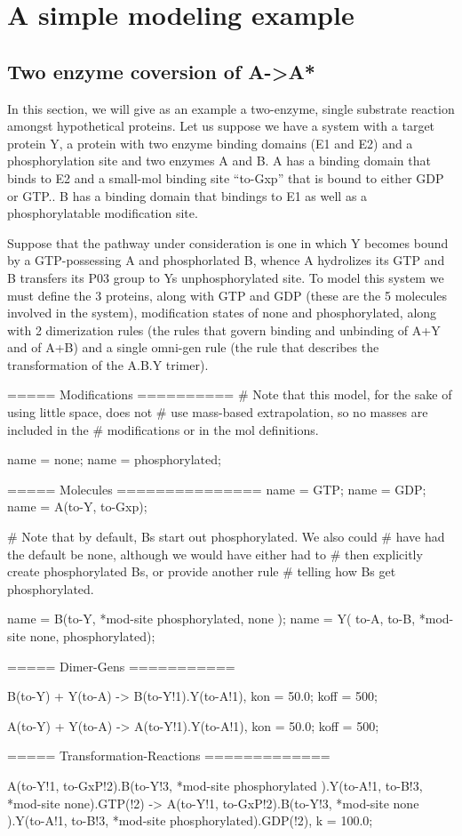 \section{A simple modeling example}

\subsection{Two enzyme coversion of A->A*}
In this section, we will give as an example a two-enzyme, single
substrate reaction amongst hypothetical proteins.  Let us suppose we
have a system with a target protein Y, a protein with two enzyme
binding domains (E1 and E2) and a phosphorylation site and two enzymes
A and B.  A has a binding domain that binds to E2 and a small-mol
binding site ``to-Gxp'' that is bound to either GDP or GTP..  B has a
binding domain that bindings to E1 as well as a phosphorylatable
modification site.  

Suppose that the pathway under consideration is one in
which Y becomes bound by a GTP-possessing A and phosphorlated B,
whence A hydrolizes its GTP and B transfers its P03 group to Ys
unphosphorylated site.  To model this system we must define the 3
proteins, along with GTP and GDP (these are the 5 molecules involved
in the system), modification states of none and phosphorylated, along
with 2 dimerization rules (the rules that govern binding and unbinding
of A+Y and of A+B) and a single omni-gen rule (the rule that describes
the transformation of the A.B.Y trimer).

\begin{ExampleMZR}
===== Modifications ==========
# Note that this model, for the sake of using little space, does not
# use mass-based extrapolation, so no masses are included in the
# modifications or in the mol definitions.

name = none;
name = phosphorylated;


===== Molecules ===============
name = GTP;
name = GDP;
name = A(to-Y, to-Gxp);

# Note that by default, Bs start out phosphorylated.  We also could
# have had the default be none, although we would have either had to
# then explicitly create phosphorylated Bs, or provide another rule
# telling how Bs get phosphorylated.

name = B(to-Y, *mod-site {phosphorylated, none} );
name = Y( to-A, to-B, *mod-site {none, phosphorylated});

===== Dimer-Gens ===========

B(to-Y) + Y(to-A) -> B(to-Y!1).Y(to-A!1),
   kon = 50.0;
   koff = 500;

A(to-Y) + Y(to-A) -> A(to-Y!1).Y(to-A!1),
   kon = 50.0;
   koff = 500;

===== Transformation-Reactions =============

A(to-Y!1, to-GxP!2).B(to-Y!3, *mod-site {phosphorylated} ).Y(to-A!1, to-B!3, *mod-site {none}).GTP(!2) ->
  A(to-Y!1, to-GxP!2).B(to-Y!3, *mod-site {none} ).Y(to-A!1, to-B!3, *mod-site {phosphorylated}).GDP(!2),
  k = 100.0;


\end{ExampleMZR}


